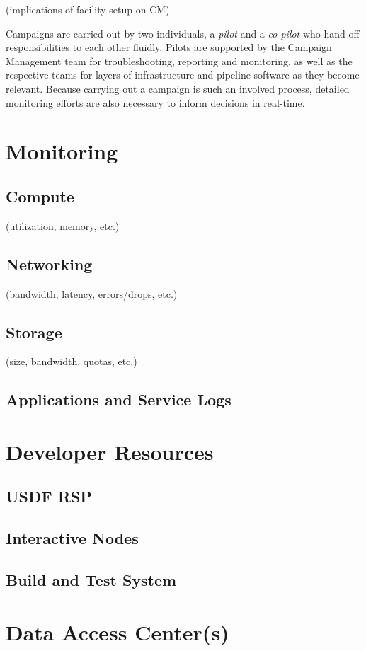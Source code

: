 		(implications of facility setup on CM)

		Campaigns are carried out by two individuals, a \textit{pilot} and a \textit{co-pilot} who hand off responsibilities to each other fluidly.
		Pilots are supported by the Campaign Management team for troubleshooting, reporting and monitoring, as well as the respective teams for layers of infrastructure and pipeline software as they become relevant.
		Because carrying out a campaign is such an involved process, detailed monitoring efforts are also necessary to inform decisions in real-time.

\section{Monitoring}
	\subsection{Compute}
	(utilization, memory, etc.)
	\subsection{Networking}
	(bandwidth, latency, errors/drops, etc.)
	\subsection{Storage}
	(size, bandwidth, quotas, etc.)
	\subsection{Applications and Service Logs}
\section{Developer Resources}
	\subsection{USDF RSP}
	\subsection{Interactive Nodes}
	\subsection{Build and Test System}
\section{Data Access Center(s)}
